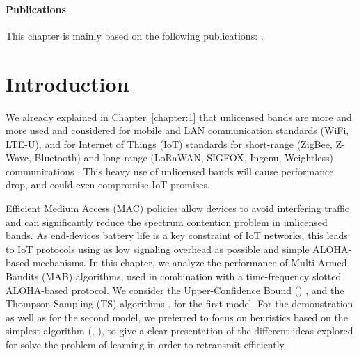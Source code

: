 \vfill{}

\paragraph{Publications}

This chapter is mainly based on the following publications: \cite{Bonnefoi17,Besson2018ICT,Besson2019WCNC,Bonnefoi2019WCNC}.

\newpage
\graphicspath{{2-Chapters/4-Chapter/Images/}}


\section{Introduction}
\label{sec:4:motivations}

We already explained in Chapter~\ref{chapter:1} that
unlicensed bands are more and more used and considered for mobile and LAN communication standards (WiFi, LTE-U), and for Internet of Things (IoT) standards for short-range (ZigBee, Z-Wave, Bluetooth) and long-range (LoRaWAN, SIGFOX, Ingenu, Weightless) communications \cite{Centenaro16}.
This heavy use of unlicensed bands will cause performance drop, and could even compromise IoT promises.

Efficient Medium Access (MAC) policies allow devices to avoid interfering traffic and can significantly reduce the spectrum contention problem in unlicensed bands.
As end-devices battery life is a key constraint of IoT networks,
this leads to IoT protocols using as low signaling overhead as possible and simple ALOHA-based mechanisms.
%
In this chapter, we analyze the performance of Multi-Armed Bandits (MAB) algorithms, used in combination with a time-frequency slotted ALOHA-based protocol.
We consider the Upper-Confidence Bound (\UCB) \cite{Auer02}, and the Thompson-Sampling (TS) algorithms \cite{Thompson33,AgrawalGoyal11,
Kaufmann12Thompson}, for the first model. For the demonstration as well as for the second model, we preferred to focus on heuristics based on the simplest algorithm (\ie, \UCB), to give a clear presentation of the different ideas explored for solve the problem of learning in order to retransmit efficiently.

